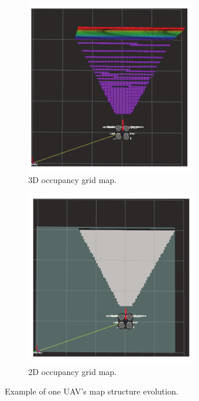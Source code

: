 \begin{figure}[H]
\begin{subfigure}[t]{0.3\linewidth}
        \includegraphics[width=\linewidth]{assets/2_20_b.png}
        \caption{{3D occupancy grid map.}}
        \label{fig:2.20b}
    \end{subfigure}
    \begin{subfigure}[t]{0.3\linewidth}
        \centering
        \includegraphics[width=\linewidth]{assets/2_20_c.png}
        \caption{{2D occupancy grid map.}}
        \label{fig:2.20c}
    \end{subfigure}
    \caption{Example of one UAV's map structure evolution.}
    \label{fig:2.20}
\end{figure}
